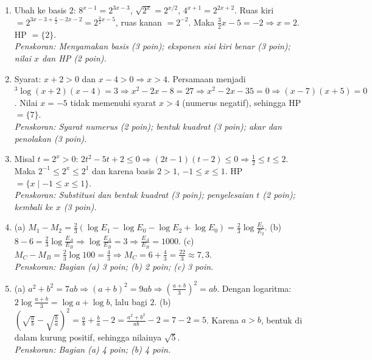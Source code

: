\documentclass[a4paper,11pt]{article}
\newcommand{\dis}{\displaystyle}
\newcommand{\alog}[2]{{}^{#1}\!\log #2}
\newcounter{no}
\begin{document}
\par{}\par\vspace{0.2em}
\small\begin{enumerate}[leftmargin=2em,itemsep=3pt,topsep=2pt]
\item[\textbf{1.}] Ubah ke basis $2$: $8^{x-1}=2^{3x-3}$, $\sqrt{2^{x}}=2^{x/2}$, $4^{x+1}=2^{2x+2}$. Ruas kiri $=2^{3x-3+\frac x2-2x-2}=2^{\frac32x-5}$, ruas kanan $=2^{-2}$. Maka $\dis\frac32x-5=-2\Rightarrow x=2$. HP $=\{2\}$. \\ \textit{Penskoran: Menyamakan basis (3 poin); eksponen sisi kiri benar (3 poin); nilai $x$ dan HP (2 poin).}
\item[\textbf{2.}] Syarat: $x+2>0$ dan $x-4>0\Rightarrow x>4$. Persamaan menjadi $\alog{3}{(x+2)(x-4)}=3\Rightarrow x^{2}-2x-8=27\Rightarrow x^{2}-2x-35=0\Rightarrow(x-7)(x+5)=0$. Nilai $x=-5$ tidak memenuhi syarat $x>4$ (numerus negatif), sehingga HP $=\{7\}$. \\ \textit{Penskoran: Syarat numerus (2 poin); bentuk kuadrat (3 poin); akar dan penolakan (3 poin).}
\item[\textbf{3.}] Misal $t=2^{x}>0$: $2t^{2}-5t+2\le0\Rightarrow(2t-1)(t-2)\le0\Rightarrow\dis\frac12\le t\le2$. Maka $2^{-1}\le2^{x}\le2^{1}$ dan karena basis $2>1$, $-1\le x\le1$. HP $=\{x\mid-1\le x\le1\}$. \\ \textit{Penskoran: Substitusi dan bentuk kuadrat (3 poin); penyelesaian $t$ (2 poin); kembali ke $x$ (3 poin).}
\item[\textbf{4.}] (a) $M_{1}-M_{2}=\dis\frac23\left(\log E_{1}-\log E_{0}-\log E_{2}+\log E_{0}\right)=\dis\frac23\log\dis\frac{E_{1}}{E_{2}}$. (b) $8-6=\dis\frac23\log\dis\frac{E_A}{E_B}\Rightarrow\log\dis\frac{E_A}{E_B}=3\Rightarrow\dis\frac{E_A}{E_B}=1000$. (c) $M_{C}-M_{B}=\dis\frac23\log100=\dis\frac43\Rightarrow M_{C}=6+\dis\frac43=\dis\frac{22}{3}\approx7{,}3$. \\ \textit{Penskoran: Bagian (a) 3 poin; (b) 2 poin; (c) 3 poin.}
\item[\textbf{5.}] (a) $a^{2}+b^{2}=7ab\Rightarrow(a+b)^{2}=9ab\Rightarrow\left(\dis\frac{a+b}{3}\right)^{2}=ab$. Dengan logaritma: $2\log\dis\frac{a+b}{3}=\log a+\log b$, lalu bagi $2$. (b) $\left(\sqrt{\dis\frac ab}-\sqrt{\dis\frac ba}\right)^{2}=\dis\frac ab+\dis\frac ba-2=\dis\frac{a^{2}+b^{2}}{ab}-2=7-2=5$. Karena $a>b$, bentuk di dalam kurung positif, sehingga nilainya $\sqrt5$. \\ \textit{Penskoran: Bagian (a) 4 poin; (b) 4 poin.}
\end{enumerate}
\end{document}
